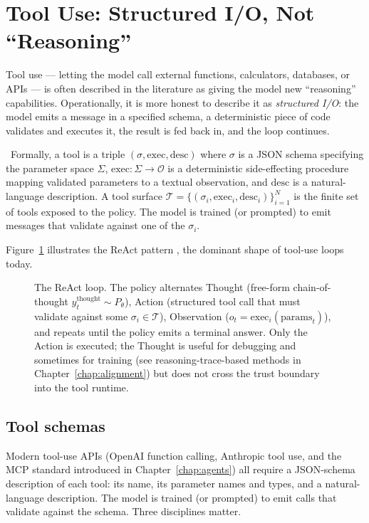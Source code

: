 \section{Tool Use: Structured I/O, Not ``Reasoning''}

Tool use --- letting the model call external functions,
calculators, databases, or APIs --- is often described in the
literature as giving the model new ``reasoning'' capabilities.
Operationally, it is more honest to describe it as \emph{structured
I/O}: the model emits a message in a specified schema, a
deterministic piece of code validates and executes it, the result
is fed back in, and the loop continues.

\Def\ Formally, a tool is a triple $(\sigma, \mathrm{exec},
\mathrm{desc})$ where $\sigma$ is a JSON schema specifying the
parameter space $\Sigma$, $\mathrm{exec} : \Sigma \to \mathcal{O}$ is a
deterministic side-effecting procedure mapping validated
parameters to a textual observation, and $\mathrm{desc}$ is a
natural-language description. A tool surface $\mathcal{T} = \{(\sigma_i,
\mathrm{exec}_i, \mathrm{desc}_i)\}_{i=1}^{N}$ is the finite set of
tools exposed to the policy. The model is trained (or prompted) to
emit messages that validate against one of the $\sigma_i$.

Figure~\ref{fig:react-loop} illustrates the ReAct pattern
\citep{yao2023react}, the dominant shape of tool-use loops today.

\begin{figure}[ht]
  \centering
  
  \caption{The ReAct loop. The policy alternates Thought (free-form
  chain-of-thought $y_t^{\mathrm{thought}} \sim P_\theta$), Action
  (structured tool call that must validate against some
  $\sigma_i \in \mathcal{T}$), Observation ($o_t =
  \mathrm{exec}_i(\mathrm{params}_t)$), and repeats until the policy
  emits a terminal answer. Only the Action is executed; the
  Thought is useful for debugging and sometimes for training (see
  reasoning-trace-based methods in Chapter~\ref{chap:alignment}) but does not cross the
  trust boundary into the tool runtime.}
  \label{fig:react-loop}
\end{figure}

\subsection{Tool schemas}

Modern tool-use APIs (OpenAI function calling, Anthropic tool use,
and the MCP standard introduced in Chapter~\ref{chap:agents}) all require a
JSON-schema description of each tool: its name, its parameter
names and types, and a natural-language description. The model is
trained (or prompted) to emit calls that validate against the
schema. Three disciplines matter.

